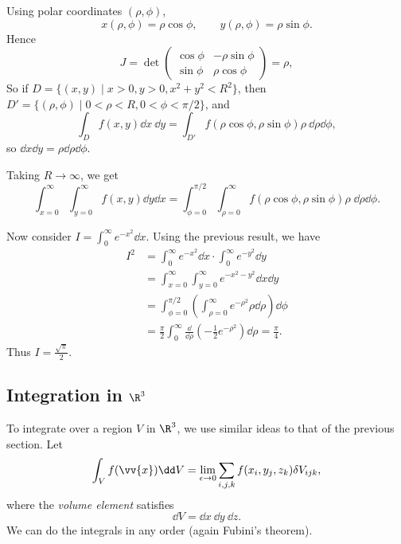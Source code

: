 \begin{example}
	Using polar coordinates $(\rho, \phi)$,
	$$
	x(\rho, \phi) = \rho \cos \phi, \quad \quad y(\rho, \phi) = \rho \sin \phi.
	$$
	Hence 
	$$
	J = \det \begin{pmatrix}
		\cos \phi & - \rho \sin \phi \\
		\sin \phi & \rho \cos \phi
	\end{pmatrix} = \rho,
	$$
	So if $D = \{(x, y)  \mid x > 0, y > 0, x^2 + y^2 < R^2 \}$, then $D' = \{(\rho, \phi) \mid 0 < \rho < R, 0 < \phi < \pi/2\}$, and
	$$
	\int_D f(x, y) \dd x\ \dd y = \int_{D'} f(\rho \cos \phi, \rho \sin \phi) \rho\  \dd \rho \dd \phi,
	$$
	so $\dd x \dd y = \rho \dd \rho \dd \phi$.

	Taking $R \rightarrow \infty$, we get
	$$
	\int_{x = 0}^{\infty} \int_{y = 0}^{\infty} f(x, y) \dd y \dd x = \int_{\phi = 0}^{\pi/2} \int_{\rho = 0}^{\infty} f(\rho \cos \phi, \rho \sin \phi) \rho \; \dd \rho \dd\phi.
	$$

	Now consider $I = \int_0^{\infty} e^{-x^2} \dd x$. Using the previous result, we have
	\begin{align*}
		I^2 &= \int_{0}^{\infty} e^{-x^{2}} \dd x \cdot \int_{0}^{\infty} e^{-y^{2}} \dd y \\
			&= \int_{x=0}^{\infty} \int_{y=0}^{\infty} e^{-x^{2}-y^{2}} \dd x \dd y \\
			&= \int_{\phi = 0}^{\pi/2} \left(\int_{\rho = 0}^{\infty} e^{- \rho^2} \rho \dd\rho \right) \dd \phi \\
			&= \frac{\pi}{2} \int_0^{\infty} \frac{\dd}{\dd \rho} \left(-\frac{1}{2} e^{- \rho^2}\right) \dd \rho = \frac{\pi}{4}.
	\end{align*}
	Thus $I = \frac{\sqrt{\pi}}{2}$.
\end{example}

\subsection{Integration in $\R^3$}

To integrate over a region $V$ in $\R^3$, we use similar ideas to that of the previous section. Let
$$
	\int_V f(\vv{x}) \dd V = \lim_{\epsilon \to 0} \sum_{i, j, k} f(x_i, y_j, z_k) \delta V_{ijk},
$$
where the \emph{volume element} satisfies
$$
\dd V = \dd x \ \dd y \ \dd z.
$$
We can do the integrals in any order (again Fubini's theorem).

